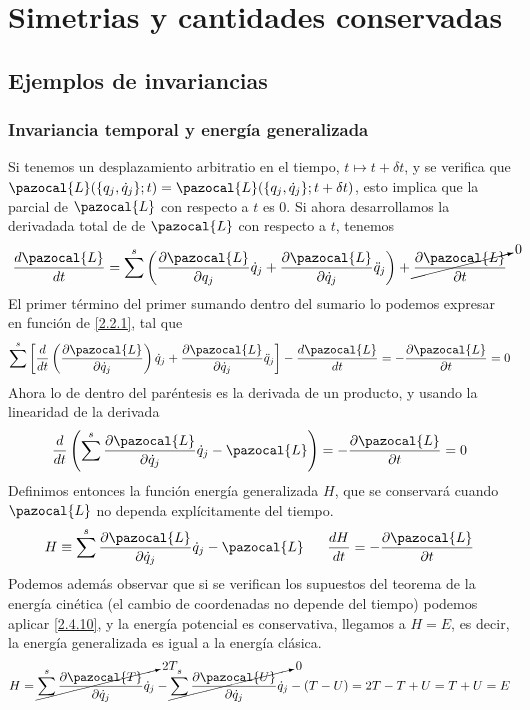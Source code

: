 \afterpage{\blankpage}

\chapter{Simetrias y cantidades conservadas}
\section{Ejemplos de invariancias} 
\subsection{Invariancia temporal y energía generalizada}
Si tenemos un desplazamiento arbitratio en el tiempo, $t\mapsto t + \delta t$, y se verifica que $\pazocal{L}(\{q_j,\dot{q}_j\};t)=\pazocal{L}(\{q_j,\dot{q}_j\};t+\delta t)$, esto implica que la parcial de $\pazocal{L}$ con respecto a $t$ es 0. Si ahora desarrollamos la derivadada total de de $\pazocal{L}$ con respecto a $t$, tenemos
\vspace{-13pt}
\[\frac{d \pazocal{L}}{dt}=\sum^s\left(\frac{\partial \pazocal{L}}{\partial q_j}\dot{q}_j+\frac{\partial \pazocal{L}}{\partial \dot{q}_j}\ddot{q}_j\right)+\cancelto{0}{\frac{\partial \pazocal{L}}{\partial t}}\]
El primer término del primer sumando dentro del sumario lo podemos expresar en función de \eqref{2.2.1}, tal que
\[\sum^s\left[\frac{d}{dt}\left(\frac{\partial \pazocal{L}}{\partial \dot{q}_j}\right)\dot{q}_j+\frac{\partial \pazocal{L}}{\partial \dot{q}_j}\ddot{q}_j\right]-\frac{d \pazocal{L}}{dt} = -\frac{\partial \pazocal{L}}{\partial t} =0\]
Ahora lo de dentro del paréntesis es la derivada de un producto, y usando la linearidad de la derivada
\begin{equation} \label{3.1.1}
    \frac{d}{dt}\left(\sum^s \frac{\partial \pazocal{L}}{\partial \dot{q}_j}\dot{q}_j-\pazocal{L}\right) = -\frac{\partial \pazocal{L}}{\partial t} =0
\end{equation} 
Definimos entonces la función energía generalizada $H$, que se conservará cuando $\pazocal{L}$ no dependa explícitamente del tiempo.
\begin{equation} \label{3.1.2}
    H \equiv \sum^s \frac{\partial \pazocal{L}}{\partial \dot{q}_j}\dot{q}_j-\pazocal{L} \ \ \ \ \ \frac{d H}{dt}=-\frac{\partial \pazocal{L}}{\partial t}
\end{equation}  
Podemos además observar que si se verifican los supuestos del teorema de la energía cinética (el cambio de coordenadas no depende del tiempo) podemos aplicar \eqref{2.4.10}, y la energía potencial es conservativa, llegamos a $H=E$, es decir, la energía generalizada es igual a la energía clásica.
\vspace{-10pt}
\begin{equation} \label{3.1.3}
    H = \cancelto{2T}{\sum^s\frac{\partial \pazocal{T}}{\partial \dot{q}_j}\dot{q}_j}-\cancelto{0}{\sum^s\frac{\partial \pazocal{U}}{\partial \dot{q}_j}\dot{q}_j}-(T-U)= 2T -T + U = T+U =E 
\end{equation} 

